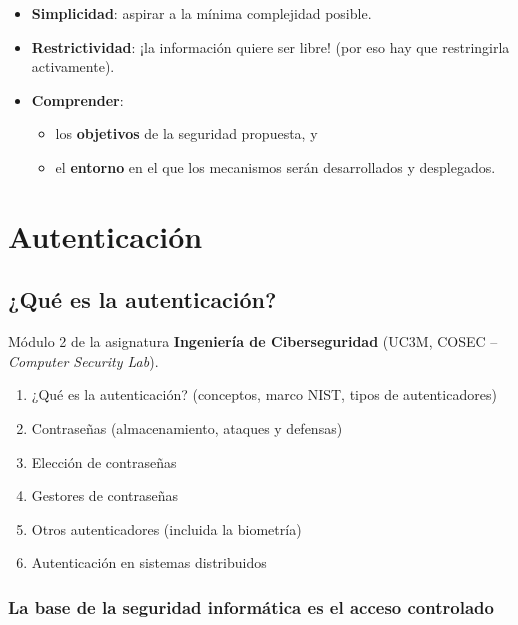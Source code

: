 \documentclass[11pt,a4paper]{report}
\begin{document}
\begin{importante}[title={Ideas clave del tema}]
\begin{itemize}
  \item \textbf{Simplicidad}: aspirar a la mínima complejidad posible.
  \item \textbf{Restrictividad}: ¡la información quiere ser libre! (por eso hay que restringirla activamente).
  \item \textbf{Comprender}:
    \begin{itemize}
      \item los \textbf{objetivos} de la seguridad propuesta, y
      \item el \textbf{entorno} en el que los mecanismos serán desarrollados y desplegados.
    \end{itemize}
\end{itemize}
\end{importante}

\part{Autenticación}
 
 
 
\chapter{¿Qué es la autenticación?}
 
\begin{importante}[title={Sobre este tema}]
Módulo 2 de la asignatura \textbf{Ingeniería de Ciberseguridad} (UC3M, COSEC -- \emph{Computer Security Lab}).
\begin{enumerate}
  \item ¿Qué es la autenticación? (conceptos, marco NIST, tipos de autenticadores)
  \item Contraseñas (almacenamiento, ataques y defensas)
  \item Elección de contraseñas
  \item Gestores de contraseñas
  \item Otros autenticadores (incluida la biometría)
  \item Autenticación en sistemas distribuidos
\end{enumerate}
\end{importante}
 
\section{La base de la seguridad informática es el acceso controlado}
 
\end{document}
